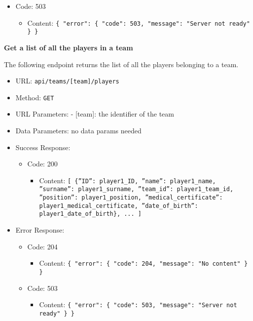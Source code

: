 \begin{itemize}
\begin{itemize}
        \item Code: 503
            \begin{itemize}
                \item Content: \texttt{\{ "error": \{ "code": 503, "message": "Server not ready" \} \}}
            \end{itemize}
    \end{itemize}
\end{itemize}


\textbf{Get a list of all the players in a team}

The following endpoint returns the list of all the players belonging to a team.
\begin{itemize}
    \item URL: \texttt{api/teams/[team]/players}
    \item Method: \texttt{GET}
    \item URL Parameters: - [team]: the identifier of the team
    \item Data Parameters: no data params needed
    \item Success Response:
    \begin{itemize}
        \item Code: 200
            \begin{itemize}
                \item Content: \texttt{[ \{”ID”: player1\_ID, ”name”: player1\_name, ”surname”: player1\_surname, ”team\_id”: player1\_team\_id, ”position”: player1\_position, ”medical\_certificate”: player1\_medical\_certificate, ”date\_of\_birth”: player1\_date\_of\_birth\}, ... ]}
            \end{itemize}
    \end{itemize}
    \item Error Response:
    \begin{itemize}
        \item Code: 204
        \begin{itemize}
            \item Content: \texttt{\{ "error": \{ "code": 204, "message": "No content" \} \}}
        \end{itemize}

        \item Code: 503
        \begin{itemize}
            \item Content: \texttt{\{ "error": \{ "code": 503, "message": "Server not ready" \} \}}
        \end{itemize}
    \end{itemize}
\end{itemize}

